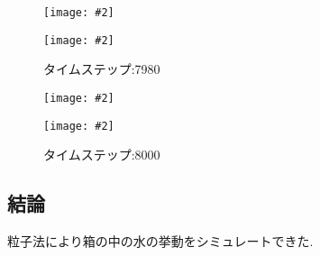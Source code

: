 \documentclass[uplatex,a4j,11pt]{jsarticle}
\makeatletter
\def\fgcaption{\def\@captype{figure}\caption}
\newcommand{\mfig}[3][width=15cm]{
\begin{center}
    \texttt{[image: \#2]}
\fgcaption{#3 \label{fig:#2}}
\end{center}
}
\makeatother
\begin{document}
\begin{figure}[htbp]
    \begin{minipage}{0.5\hsize}
        \mfig[width=7cm]{sim2/out0797.eps}{タイムステップ:7970}
    \end{minipage}
    \begin{minipage}{0.5\hsize}
        \mfig[width=7cm]{sim2/out0798.eps}{タイムステップ:7980}
    \end{minipage} 
\end{figure}
\begin{figure}[htbp]
    \begin{minipage}{0.5\hsize}
        \mfig[width=7cm]{sim2/out0799.eps}{タイムステップ:7990}
    \end{minipage}
    \begin{minipage}{0.5\hsize}
        \mfig[width=7cm]{sim2/out0800.eps}{タイムステップ:8000}
    \end{minipage} 
\end{figure}
\subsection{結論}
粒子法により箱の中の水の挙動をシミュレートできた.
\newpage

\newpage

\end{document}
